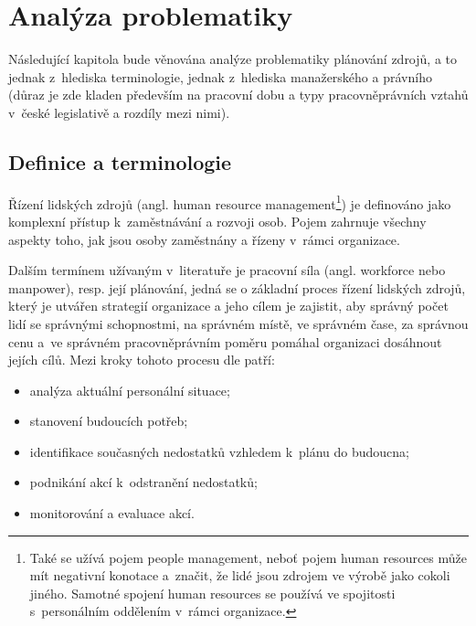 \documentclass[twoside]{ctuthesis}
\begin{document}
%


\chapter{Analýza problematiky}
Následující kapitola bude věnována analýze problematiky plánování zdrojů, a to jednak z~hlediska terminologie, jednak z~hlediska manažerského a právního (důraz je zde kladen především na pracovní dobu a typy pracovněprávních vztahů v~české legislativě a rozdíly mezi nimi).

\section{Definice a terminologie}

Řízení lidských zdrojů (angl. human resource management\footnote{Také se užívá pojem people management, neboť pojem human resources může mít negativní konotace a~značit, že lidé jsou zdrojem ve výrobě jako cokoli jiného. \cite[s.~1]{armstrong2014} Samotné spojení human resources se používá ve spojitosti s~personálním oddělením v~rámci organizace. }) je definováno jako komplexní přístup k~zaměstnávání a rozvoji osob. Pojem zahrnuje všechny aspekty toho, jak jsou osoby zaměstnány a řízeny v~rámci organizace. \cite[s.~1]{armstrong2014}

Dalším termínem užívaným v~literatuře je pracovní síla (angl. workforce nebo manpower), resp. její plánování, jedná se o základní proces řízení lidských zdrojů, který je utvářen strategií organizace a jeho cílem je zajistit, aby správný počet lidí se správnými schopnostmi, na správném místě, ve správném čase, za správnou cenu a~ve správném pracovněprávním poměru pomáhal organizaci dosáhnout jejích cílů. \cite{cipd2020_workforce} Mezi kroky tohoto procesu dle \cite{cipd2020_workforce} patří:
\begin{itemize}
	\item analýza aktuální personální situace;
	\item stanovení budoucích potřeb;
	\item identifikace současných nedostatků vzhledem k~plánu do budoucna;
	\item podnikání akcí k~odstranění nedostatků;
	\item monitorování a evaluace akcí.
\end{itemize}
\end{document}
